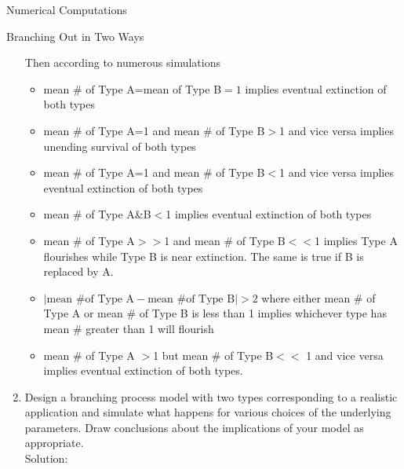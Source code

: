\documentclass[12pt]{article}
\numberwithin{equation}{section}
\begin{document}
\begin{section}{Numerical Computations}
\begin{subsection}{Branching Out in Two Ways}
\begin{enumerate}
    Then according to numerous simulations
    \begin{itemize}
    \item mean \# of Type A=mean of Type B$=1$ implies eventual extinction of both types
    \item mean \# of Type A=1 and mean \# of Type B$>$1 and vice versa implies unending survival of both types
    \item mean \# of Type A=1 and mean \# of Type B$<$1 and vice versa implies eventual extinction of both types
    \item mean \# of Type A\&B$<$1 implies eventual extinction of both types
    \item mean \# of Type A$>>$1 and mean \# of Type B$<<$1 implies Type A flourishes while Type B is near extinction. The same is true if B is replaced by A.
    \item $|\text{mean \# of Type A}-\text{mean \# of Type B}|>2$ where either mean \# of Type A or mean \# of Type B is less than 1 implies whichever type has mean \# greater than 1 will flourish
    \item mean \# of Type A $>$1 but mean \# of Type B$<<$ 1 and vice versa implies eventual extinction of both types.
    \end{itemize}

    \item Design a branching process model with two types corresponding to a realistic application and simulate what happens for various choices of the underlying parameters. Draw conclusions about the implications of your model as appropriate.\\

        Solution:\\


\end{enumerate}
\end{subsection}
\end{section}
\end{document}
